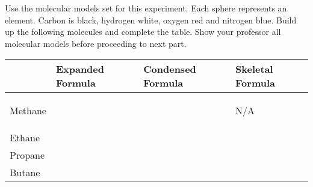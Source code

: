 \documentclass[main.tex]{subfiles}
\begin{document}
\begin{fullwidth}
\vspace{0.2cm}{\large \bfseries Linear Alkanes}
Use the molecular models set for this experiment. Each sphere represents an element. Carbon is black, hydrogen white, oxygen red and nitrogen blue. Build up the following molecules and complete the table. Show your professor all molecular models before proceeding to next part.
\begin{center}\begin{tabular}{ |p{1.3cm}|p{5cm}| m{5cm}| m{5cm}| }
\hline
    & Expanded Formula &   Condensed Formula & Skeletal Formula   \\
\hline
\vspace{0cm}Methane\vspace{1.5cm} &       & & \begin{center}\Huge N/A\end{center} \\
\hline
\vspace{0cm}Ethane\vspace{1.5cm} &    &    & \\
\hline
\vspace{0cm}Propane\vspace{1.5cm} &  &      & \\
\hline
\vspace{0cm}Butane\vspace{1.5cm} &  &      & \\
\hline
\end{tabular}\end{center}
\end{fullwidth}
\end{document}
